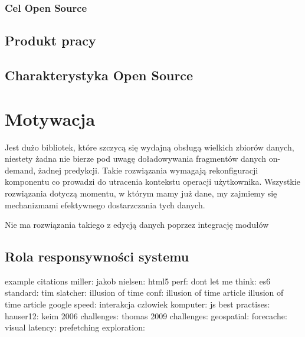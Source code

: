 \subsubsection*{Cel Open Source}

\subsection{Produkt pracy}

\subsection{Charakterystyka Open Source}


\section{Motywacja}

Jest dużo bibliotek, które szczycą się wydajną obsługą wielkich zbiorów danych, niestety żadna nie bierze pod uwagę doładowywania fragmentów danych on-demand, żadnej predykcji. Takie rozwiązania wymagają rekonfiguracji komponentu co prowadzi do utracenia kontekstu operacji użytkownika.
Wszystkie rozwiązania dotyczą momentu, w którym mamy już dane, 
my zajmiemy się mechanizmami efektywnego dostarzczania tych danych.

Nie ma rozwiązania takiego z edycją danych poprzez integrację modułów




\subsection{Rola responsywności systemu}
example citations
miller: \cite{Miller1968}
jakob nielsen: \cite{jakob1993usability}
html5 perf: \cite{html5-perf}
dont let me think: \cite{dont-let-me-think}
es6 standard: \cite{es6-standard}
tim slatcher: \cite{conference}
illusion of time conf: \cite{illusion-of-time}
illusion of time article \cite{why-performance-matters-part1}
illusion of time article \cite{why-performance-matters-part2}
google speed: \cite{google-speed}
interakcja człowiek komputer: \cite{interakcja}
js best practises: \cite{js-best-practises}
hauser12: \cite{Hauser12VisTutorial}
keim 2006 challenges: \cite{keim2006challenges}
thomas 2009 challenges: \cite{thomas2009challenges}
geospatial: \cite{sample2010tile}
forecache: \cite{forecache}
visual latency: \cite{effect-interactive-latency}
prefetching exploration: \cite{prefetching-visual-data-exploration}

